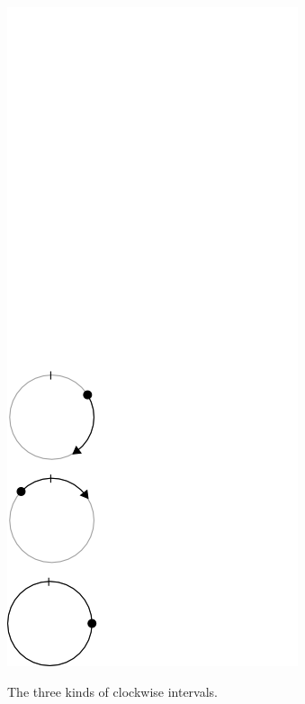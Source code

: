 \begin{marginfigure}
\includegraphics[width=\linewidth]{figures/circular_intervals/cw.png}
\caption{The three kinds of clockwise intervals.}
\end{marginfigure}
